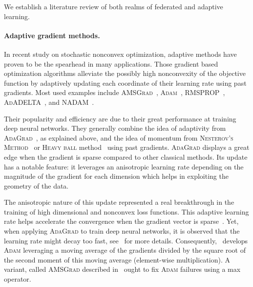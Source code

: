 \documentclass[11pt]{article}
\begin{document}

We establish a literature review of both realms of federated and adaptive learning.
\paragraph{Adaptive gradient methods.}
In recent study on stochastic nonconvex optimization, adaptive methods have proven to be the spearhead in many applications.
Those gradient based optimization algorithms alleviate the possibly high nonconvexity of the objective function by adaptively updating each coordinate of their learning rate using past gradients. Most used examples include \textsc{AMSGrad}~\citep{RKK18}, \textsc{Adam}~\citep{KB15}, \textsc{RMSPROP}~\citep{TH12}, \textsc{AdADELTA}~\citep{Z12}, and \textsc{NADAM}~\citep{D16}.

Their popularity and efficiency are due to their great performance at training deep neural networks.
They generally combine the idea of adaptivity from \textsc{AdaGrad}~\citep{DHS11,MS10}, as explained above, and the idea of momentum from \textsc{Nesterov's Method}~\citep{N04} or \textsc{Heavy ball} method~\citep{P64} using past gradients.
\textsc{AdaGrad} displays a great edge when the gradient is sparse compared to other classical methods.
Its update has a notable feature: it leverages an anisotropic learning rate depending on the magnitude of the gradient for each dimension which helps in exploiting the geometry of the data. 

The anisotropic nature of this update represented a real breakthrough in the training of high dimensional and nonconvex loss functions.
This adaptive learning rate helps accelerate the convergence when the gradient vector is sparse~\citep{DHS11}. Yet, when applying \textsc{AdaGrad} to train deep neural networks, it is observed that the learning rate might decay too fast, see~\citep{KB15} for more details.
Consequently,~\citet{KB15} develops \textsc{Adam} leveraging a moving average of the gradients divided by the square root of the second moment of this moving average (element-wise multiplication).
A variant, called \textsc{AMSGrad} described in~\citep{RKK18} ought to fix \textsc{Adam} failures using a max operator.
\end{document}
